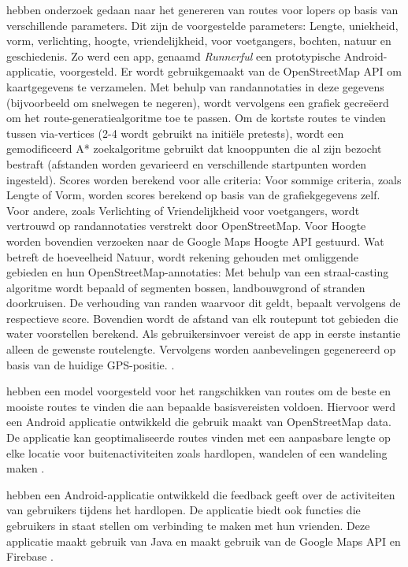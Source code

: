     \textcite{Loepp2018} hebben onderzoek gedaan naar het genereren van routes voor lopers op basis van verschillende parameters.
    Dit zijn de voorgestelde parameters: Lengte, uniekheid, vorm, verlichting, hoogte, vriendelijkheid, voor voetgangers, bochten, natuur en geschiedenis.
    Zo werd een app, genaamd \emph{Runnerful} een prototypische Android-applicatie, voorgesteld. Er wordt gebruikgemaakt van de OpenStreetMap API om kaartgegevens te verzamelen. 
    Met behulp van randannotaties in deze gegevens (bijvoorbeeld om snelwegen te negeren), 
    wordt vervolgens een grafiek gecreëerd om het route-generatiealgoritme toe te passen.
    Om de kortste routes te vinden tussen via-vertices (2-4 wordt gebruikt na initiële pretests), wordt een gemodificeerd A* zoekalgoritme gebruikt dat knooppunten 
    die al zijn bezocht bestraft (afstanden worden gevarieerd en verschillende startpunten worden ingesteld). 
    Scores worden berekend voor alle criteria: Voor sommige criteria, zoals Lengte of Vorm, worden scores berekend op basis van de grafiekgegevens zelf. 
    Voor andere, zoals Verlichting of Vriendelijkheid voor voetgangers, wordt vertrouwd op randannotaties verstrekt door OpenStreetMap. 
    Voor Hoogte worden bovendien verzoeken naar de Google Maps Hoogte API gestuurd. Wat betreft de hoeveelheid Natuur, wordt rekening gehouden met omliggende gebieden en hun OpenStreetMap-annotaties:
    Met behulp van een straal-casting algoritme wordt bepaald of segmenten bossen, landbouwgrond of stranden doorkruisen. De verhouding van randen waarvoor dit geldt, 
    bepaalt vervolgens de respectieve score. Bovendien wordt de afstand van elk routepunt tot gebieden die water voorstellen berekend. 
    Als gebruikersinvoer vereist de app in eerste instantie alleen de gewenste routelengte. 
    Vervolgens worden aanbevelingen gegenereerd op basis van de huidige GPS-positie. 
     \autocite{Loepp2018}.

    \textcite{Schulze2016} hebben een model voorgesteld voor het rangschikken van routes om de beste en mooiste routes te vinden
    die aan bepaalde basisvereisten voldoen. Hiervoor werd een Android applicatie ontwikkeld die gebruik maakt van OpenStreetMap data.
    De applicatie kan geoptimaliseerde routes vinden met een aanpasbare lengte op elke locatie voor buitenactiviteiten 
    zoals hardlopen, wandelen of een wandeling maken \autocite{Schulze2016}.

    \textcite{Adwinda2020} hebben een Android-applicatie ontwikkeld die feedback geeft over de activiteiten van gebruikers tijdens het hardlopen.
    De applicatie biedt ook functies die gebruikers in staat stellen om verbinding te maken met hun vrienden. 
    Deze applicatie maakt gebruik van Java en maakt gebruik van de Google Maps API en Firebase \autocite{Adwinda2020}.

